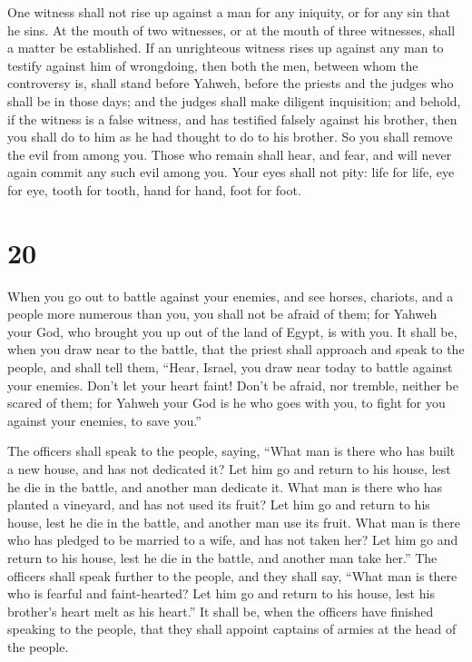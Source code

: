  One witness shall not rise up against a man for any
iniquity, or for any sin that he sins. At the mouth of two witnesses, or
at the mouth of three witnesses, shall a matter be established.
 If an unrighteous witness rises up against any man to
testify against him of wrongdoing,  then both the men,
between whom the controversy is, shall stand before Yahweh, before the
priests and the judges who shall be in those days;  and
the judges shall make diligent inquisition; and behold, if the witness
is a false witness, and has testified falsely against his brother,
 then you shall do to him as he had thought to do to his
brother. So you shall remove the evil from among you. 
Those who remain shall hear, and fear, and will never again commit any
such evil among you.  Your eyes shall not pity: life for
life, eye for eye, tooth for tooth, hand for hand, foot for foot.

\hypertarget{section-19}{%
\section{20}\label{section-19}}

 When you go out to battle against your enemies, and see
horses, chariots, and a people more numerous than you, you shall not be
afraid of them; for Yahweh your God, who brought you up out of the land
of Egypt, is with you.  It shall be, when you draw near to
the battle, that the priest shall approach and speak to the people,
 and shall tell them, ``Hear, Israel, you draw near today
to battle against your enemies. Don't let your heart faint! Don't be
afraid, nor tremble, neither be scared of them;  for
Yahweh your God is he who goes with you, to fight for you against your
enemies, to save you.''

 The officers shall speak to the people, saying, ``What
man is there who has built a new house, and has not dedicated it? Let
him go and return to his house, lest he die in the battle, and another
man dedicate it.  What man is there who has planted a
vineyard, and has not used its fruit? Let him go and return to his
house, lest he die in the battle, and another man use its fruit.
 What man is there who has pledged to be married to a
wife, and has not taken her? Let him go and return to his house, lest he
die in the battle, and another man take her.''  The
officers shall speak further to the people, and they shall say, ``What
man is there who is fearful and faint-hearted? Let him go and return to
his house, lest his brother's heart melt as his heart.'' 
It shall be, when the officers have finished speaking to the people,
that they shall appoint captains of armies at the head of the people.

